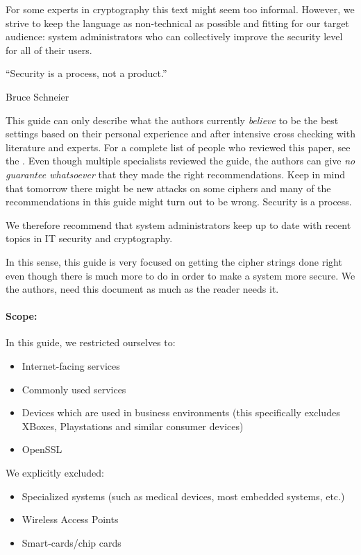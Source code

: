 For some experts in cryptography this text might seem too informal. However, we
strive to keep the language as non-technical as possible and fitting for our
target audience: system administrators who can collectively improve the
security level for all of their users. 



\epigraph{``Security is a process, not a product.''}{Bruce Schneier}

This guide can only describe what the authors currently
\emph{believe} to be the best settings based on their personal experience and
after intensive cross checking with literature and experts. For a complete list
of people who reviewed this paper, see the .
Even though multiple specialists reviewed the guide, the authors can give
\emph{no guarantee whatsoever} that they made the right recommendations. Keep in
mind that tomorrow there might be new attacks on some ciphers and many of the
recommendations in this guide might turn out to be wrong. Security is a
process.


We therefore recommend that system administrators keep up to date with recent
topics in IT security and cryptography. 


In this sense, this guide is very focused on getting the cipher strings done
right even though there is much more to do in order to make a system more
secure.  We the authors, need this document as much as the reader needs it.

\paragraph{Scope:}
\label{section:Scope}

In this guide, we restricted ourselves to:
\begin{itemize}
\item Internet-facing services
\item Commonly used services
\item Devices which are used in business environments (this specifically excludes XBoxes, Playstations and similar consumer devices)
\item OpenSSL 
\end{itemize}

We explicitly excluded:
\begin{itemize}
\item Specialized systems (such as medical devices, most embedded systems, etc.)
\item Wireless Access Points
\item Smart-cards/chip cards
\end{itemize}


